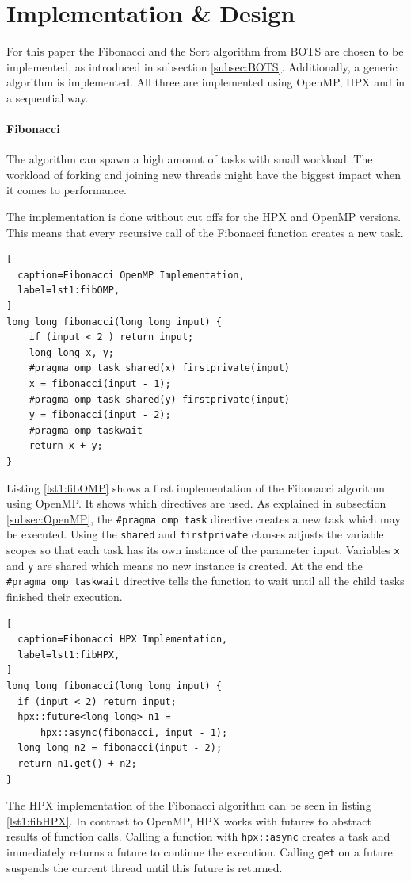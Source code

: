\section{Implementation \& Design}
\label{sec:implem}
  For this paper the Fibonacci and the Sort algorithm from BOTS are chosen to be implemented, as introduced in subsection \ref{subsec:BOTS}.
  Additionally, a generic algorithm is implemented.
  All three are implemented using OpenMP, HPX and in a sequential way.
  
  \paragraph{Fibonacci}
  The algorithm can spawn a high amount of tasks with small workload.
  The workload of forking and joining new threads might have the biggest impact when it comes to performance.
  
  The implementation is done without cut offs for the HPX and OpenMP versions.
  This means that every recursive call of the Fibonacci function creates a new task.
  \begin{lstlisting}[
  caption=Fibonacci OpenMP Implementation,
  label=lst1:fibOMP,
]
long long fibonacci(long long input) {
    if (input < 2 ) return input;
    long long x, y;
    #pragma omp task shared(x) firstprivate(input)
    x = fibonacci(input - 1);
    #pragma omp task shared(y) firstprivate(input)
    y = fibonacci(input - 2);
    #pragma omp taskwait
    return x + y;
}
\end{lstlisting}
  Listing \ref{lst1:fibOMP} shows a first implementation of the Fibonacci algorithm using OpenMP.
  It shows which directives are used.
  As explained in subsection \ref{subsec:OpenMP}, the \texttt{\#pragma omp task} directive creates a new task which may be executed.
  Using the \texttt{shared} and \texttt{firstprivate} clauses adjusts the variable scopes so that each task has its own instance of the parameter input.
  Variables \texttt{x} and \texttt{y} are shared which means no new instance is created.
  At the end the \texttt{\#pragma omp taskwait} directive tells the function to wait until all the child tasks finished their execution.
  
\begin{lstlisting}[
  caption=Fibonacci HPX Implementation,
  label=lst1:fibHPX,
]
long long fibonacci(long long input) {
  if (input < 2) return input;
  hpx::future<long long> n1 =
      hpx::async(fibonacci, input - 1);
  long long n2 = fibonacci(input - 2);
  return n1.get() + n2;
}
\end{lstlisting}
  The HPX implementation of the Fibonacci algorithm can be seen in listing \ref{lst1:fibHPX}.
  In contrast to OpenMP, HPX works with futures to abstract results of function calls.
  Calling a function with \texttt{hpx::async} creates a task and immediately returns a future to continue the execution.
  Calling \texttt{get} on a future suspends the current thread until this future is returned.
  \\
 
